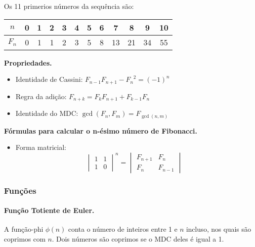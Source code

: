 Os 11 primerios números da sequência são:
\begin{center}
    \begin{tabular}{c|c c c c c c c c c c c}
        $n$ & 0 &1&2&3&4&5&6&7&8&9&10\\
        \hline
        $F_n$&0&1&1&2&3&5&8&13&21&34&55
    \end{tabular}
    
\end{center}

\textbf{Propriedades.}
\begin{itemize}
    \item Identidade de Cassini: $F_{n-1}F_{n+1}-{F_n}^2 = (-1)^n$
    \item Regra da adição: $F_{n+k} = F_kF_{n+1}+F_{k-1}F_n$
    \item Identidade do MDC: $\gcd(F_n,F_m)=F_{\gcd(n,m)}$
\end{itemize}

\textbf{Fórmulas para calcular o n-ésimo número de Fibonacci.}

\begin{itemize}
    \item Forma matricial: 
    $$\begin{vmatrix}
        1 & 1 \\
        1 & 0
    \end{vmatrix}^n 
    = 
    \begin{vmatrix}
        F_{n+1} & F_{n} \\
        F_{n} & F_{n-1} 
    \end{vmatrix}$$
\end{itemize}

\subsubsection{Funções}
\paragraph{Função Totiente de Euler.} A função-phi $\phi(n)$ conta o número de inteiros entre 1 e $n$ incluso, nos quais são coprimos com $n$. Dois números são coprimos se o MDC deles é igual a 1.

